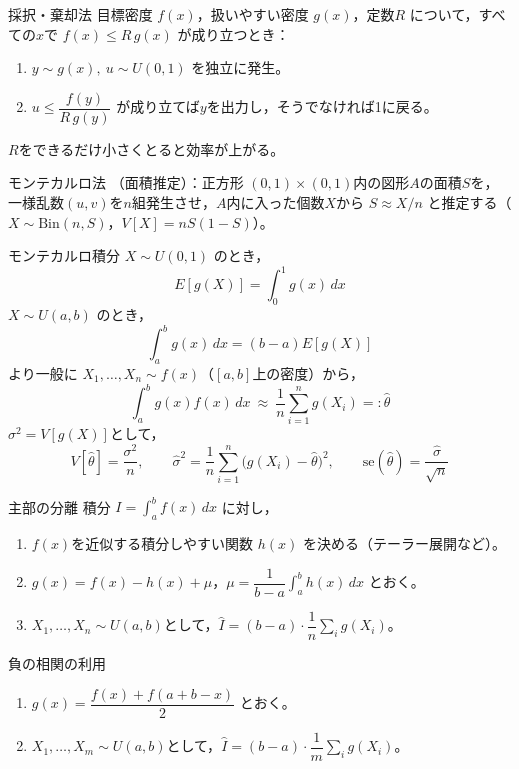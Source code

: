 \documentclass[a4paper,11pt]{ltjsarticle}
\begin{document}
\begin{term}{採択・棄却法}
目標密度 $f(x)$，扱いやすい密度 $g(x)$，定数$R$ について，すべての$x$で $f(x)\le R\,g(x)$ が成り立つとき：
\begin{enumerate}[label=\arabic*.]
\item $y\sim g(x),\ u\sim U(0,1)$ を独立に発生。
\item $u \le \dfrac{f(y)}{R\,g(y)}$ が成り立てば$y$を出力し，そうでなければ1に戻る。
\end{enumerate}
$R$をできるだけ小さくとると効率が上がる。
\end{term}

\begin{term}{モンテカルロ法}
（面積推定）：正方形 $(0,1)\times(0,1)$内の図形$A$の面積$S$を，一様乱数$(u,v)$を$n$組発生させ，$A$内に入った個数$X$から $S\approx X/n$ と推定する（$X\sim\mathrm{Bin}(n,S)$，$V[X]=nS(1-S)$）。
\end{term}

\begin{term}{モンテカルロ積分}
$X\sim U(0,1)$ のとき，
\[
E[g(X)] = \int_0^1 g(x)\,dx
\]
$X\sim U(a,b)$ のとき，
\[
\int_a^b g(x)\,dx = (b-a)E[g(X)]
\]
より一般に $X_1,\dots,X_n\sim f(x)$（$[a,b]$上の密度）から，
\[
\int_a^b g(x)f(x)\,dx \ \approx\ \frac1n\sum_{i=1}^n g(X_i) =: \hat\theta
\]
$\sigma^2=V[g(X)]$として，
\[
V[\hat\theta] = \frac{\sigma^2}{n}, \qquad \hat\sigma^2 = \frac1n\sum_{i=1}^n\big(g(X_i)-\hat\theta\big)^2, \qquad
\mathrm{se}(\hat\theta) = \frac{\hat\sigma}{\sqrt n}
\]
\end{term}

\begin{term}{主部の分離}
積分 $I=\int_a^b f(x)\,dx$ に対し，
\begin{enumerate}[label=\arabic*.]
\item $f(x)$を近似する積分しやすい関数 $h(x)$ を決める（テーラー展開など）。
\item $g(x)=f(x)-h(x)+\mu$，$\mu=\dfrac{1}{b-a}\displaystyle\int_a^b h(x)\,dx$ とおく。
\item $X_1,\dots,X_n\sim U(a,b)$として，$\hat I = (b-a)\cdot\dfrac1n\sum_i g(X_i)$。
\end{enumerate}
\end{term}

\begin{term}{負の相関の利用}
\begin{enumerate}[label=\arabic*.]
\item $g(x) = \dfrac{f(x)+f(a+b-x)}{2}$ とおく。
\item $X_1,\dots,X_m\sim U(a,b)$として，$\hat I = (b-a)\cdot\dfrac1m\sum_i g(X_i)$。
\end{enumerate}
\end{term}
\end{document}
